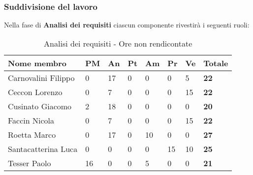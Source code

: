 		\subsubsection{Suddivisione del lavoro} %
		\label{ssub:suddivisione_del_lavoro}
		Nella fase di \textbf{Analisi dei requisiti} ciascun componente rivestirà i seguenti ruoli: \\
			\begin{table}[!htt]
				\begin{center}
					\begin{tabularx}{0.9\textwidth}{|l|l|l|l|l|l|l|X|}
						\hline
						\textbf{Nome membro} & \textbf{PM} & \textbf{An} & \textbf{Pt} & \textbf{Am} & \textbf{Pr} & \textbf{Ve} & \textbf{Totale} \\
						\hline
						Carnovalini Filippo & 0 & 17 & 0 & 0 & 0 & 5 & \textbf{22} \\
						\hline
						Ceccon Lorenzo & 0 & 7 & 0 & 0 & 0 & 15 & \textbf{22} \\
						\hline
						Cusinato Giacomo & 2 & 18 & 0 & 0 & 0 & 0 & \textbf{20} \\
						\hline
						Faccin Nicola & 0 & 7 & 0 & 0 & 0 & 15 & \textbf{22} \\
						\hline
						Roetta Marco & 0 & 17 & 0 & 10 & 0 & 0 & \textbf{27} \\
						\hline
						Santacatterina Luca & 0 & 0 & 0 & 0 & 15 & 10 & \textbf{25} \\
						\hline
						Tesser Paolo & 16 & 0 & 0 & 5 & 0 & 0 & \textbf{21} \\
						\hline		
					\end{tabularx}
				\end{center}
			\caption{Analisi dei requisiti - Ore non rendicontate}
			\end{table}
			
